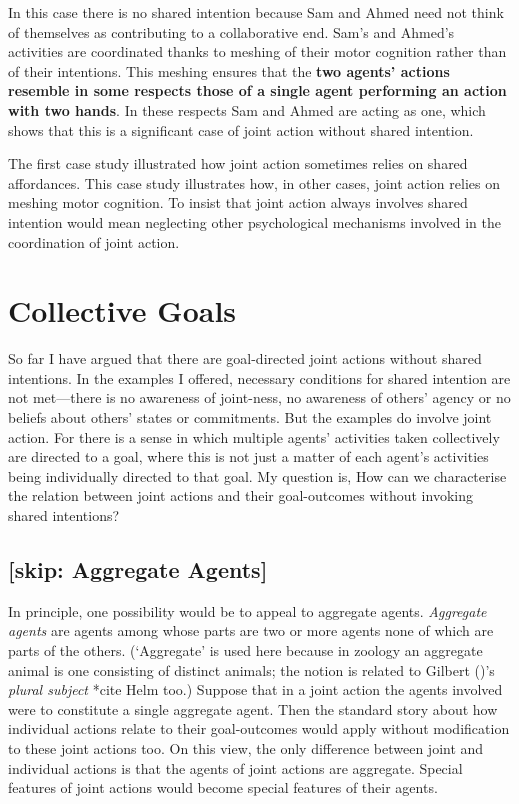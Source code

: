 \documentclass[12pt,a4paper]{extarticle}
\begin{document}
In this case there is no shared intention because Sam and Ahmed need not think of themselves as contributing to a collaborative end.  Sam's and Ahmed's activities are coordinated thanks to meshing of their motor cognition rather than of their intentions.  This meshing ensures that the \textbf{two agents' actions resemble in some respects those of a single agent performing an action with two hands}.  In these respects Sam and Ahmed are acting as one, which shows that this is a significant case of joint action without shared intention.  

The first case study illustrated how joint action sometimes relies on shared affordances.  This case study illustrates how, in other cases, joint action relies on meshing motor cognition.  To insist that joint action always involves shared intention would mean neglecting other psychological mechanisms involved in the coordination of joint action.



\section{Collective Goals}
\label{section_collective}

So far I have argued that there are goal-directed joint actions without shared intentions.  
In the examples I offered, necessary conditions for shared intention are not met---there is no awareness of joint-ness, no awareness of others' agency or no beliefs about others' states or commitments.  But the examples do involve joint action.  For there is a sense in which multiple agents' activities taken collectively are directed to a goal, where this is not just a matter of each agent's activities being individually directed to that goal.
My question is, How can we characterise the relation between joint actions and their goal-outcomes without invoking shared intentions?  

\subsection{[skip: Aggregate Agents]}
In principle, one possibility would be to appeal to aggregate agents.
\emph{Aggregate agents} are agents among whose parts are two or more agents 
none of which are parts of the others. 
(`Aggregate' is used here  because in zoology an aggregate animal is one consisting of distinct animals; the notion is related to Gilbert (\citeyear{Gilbert:1992rs})'s \emph{plural subject} *cite Helm too.)  
Suppose that in a joint action the agents involved were to constitute a single aggregate agent.  
Then the standard story about how individual actions relate to their goal-outcomes would apply without modification to these joint actions too.  On this view, the only difference between joint and individual actions is that the agents of joint actions are aggregate.  Special features of joint actions would become special features of their agents.
\end{document}
